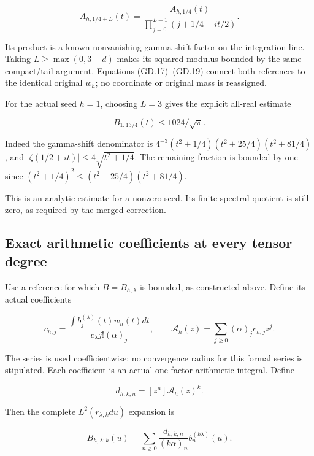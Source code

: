 \[
A_{h,1/4+L}(t)
=\frac{A_{h,1/4}(t)}{\prod_{j=0}^{L-1}(j+1/4+it/2)}.                \tag{GD.22}
\]

Its product is a known nonvanishing gamma-shift factor on the
integration line. Taking \(L\ge\max(0,3-d)\) makes its squared modulus
bounded by the same compact/tail argument. Equations (GD.17)--(GD.19) connect
both references to the identical original \(w_h\); no coordinate or
original mass is reassigned.

For the actual seed \(h=1\), choosing \(L=3\) gives the explicit
all-real estimate

\[
\boxed{
B_{1,13/4}(t)\le1024/\sqrt\pi.
}                                                                   \tag{GD.23}
\]

Indeed the gamma-shift denominator is
\(4^{-3}(t^2+1/4)(t^2+25/4)(t^2+81/4)\), and
\(|\zeta(1/2+it)|\le4\sqrt{t^2+1/4}\). The remaining fraction is bounded
by one since \((t^2+1/4)^2\le(t^2+25/4)(t^2+81/4)\).

This is an analytic estimate for a nonzero seed. Its finite spectral
quotient is still zero, as required by the merged correction.

\subsection[\hspace{0.4em}Exact arithmetic coefficients at every tensor
degree]{Exact arithmetic coefficients at every tensor
degree}\label{gammad-exact-arithmetic-coefficients-at-every-tensor-degree}

Use a reference for which \(B=B_{h,\lambda}\) is bounded, as constructed
above. Define its actual coefficients

\[
c_{h,j}=\frac{\int b_j^{(\lambda)}(t)w_h(t)dt}
                 {c_\lambda j!(\alpha)_j},\qquad
\mathcal A_h(z)=\sum_{j\ge0}(\alpha)_j c_{h,j}z^j.                  \tag{GD.24}
\]

The series is used coefficientwise; no convergence radius for this
formal series is stipulated. Each coefficient is an actual one-factor
arithmetic integral. Define

\[
d_{h,k,n}=[z^n]\mathcal A_h(z)^k.
\]

Then the complete \(L^2(r_{\lambda,k}du)\) expansion is

\[
\boxed{
B_{h,\lambda;k}(u)
=\sum_{n\ge0}\frac{d_{h,k,n}}{(k\alpha)_n}
                                     b_n^{(k\lambda)}(u).
}                                                                   \tag{GD.25}
\]

